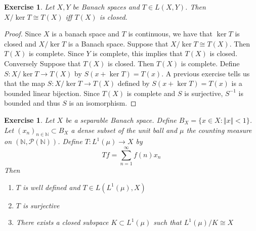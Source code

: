\documentclass[12pt]{amsart}
\newtheorem{ex}[thm]{Exercise}
\newcommand{\N}{\mathbb{N}}
\newcommand{\MP}{\mathcal{P}}
\newcommand{\n}{\Vert}
\begin{document}
\begin{ex}
Let $X, Y$ be Banach spaces and $T \in L(X,Y)$. Then $X/\ker T \cong T(X)$ iff $T(X)$ is closed.
\end{ex}

\begin{proof}
Since $X$ is a banach space and $T$ is continuous, we have that $\ker T$ is closed and $X/ \ker T$ is a Banach space. Suppose that $X/ \ker T \cong T(X)$. Then $T(X)$ is complete. Since $Y$ is complete, this implies that $T(X)$ is closed. \\
Conversely Suppose that $T(X)$ is closed. Then $T(X)$ is complete. Define $S: X/ \ker T \rightarrow T(X)$ by $S(x + \ker T) = T(x)$. A previous exercise tells us that the map $S: X/ \ker T \rightarrow T(X)$ defined by $S(x + \ker T) = T(x)$ is a bounded linear bijection. Since $T(X)$ is complete and $S$ is surjective, $S^{-1}$ is bounded and thus $S$ is an isomorphism.   
\end{proof}

\begin{ex}
Let $X$ be a separable Banach space. Define $B_X = \{x \in X: \n x \n < 1\}$. Let $(x_n)_{n \in \N} \subset B_X $ a dense subset of the unit ball and $\mu$ the counting measure on $(\N, \MP(\N))$. Define $T: L^1(\mu) \rightarrow X$ by $$Tf = \sum_{n=1}^{\infty}f(n)x_n$$ Then 
\begin{enumerate}
\item $T$ is well defined and $T \in L(L^1(\mu), X)$
\item $T$ is surjective
\item There exists a closed subspace $K \subset L^1(\mu)$ such that $L^1(\mu)/K \cong X$ 
\end{enumerate} 
\end{ex}
\end{document}
